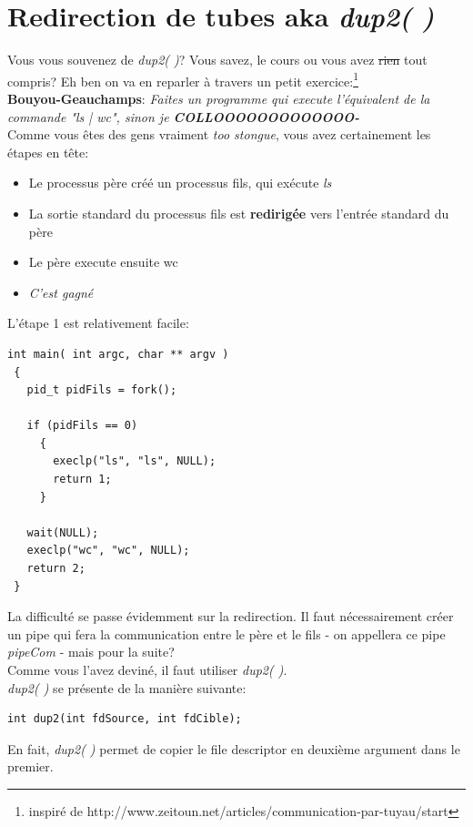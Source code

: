 \documentclass{report}
\begin{document}
\section{Redirection de tubes aka \emph{dup2( )}}
Vous vous souvenez de \emph{dup2( )}? Vous savez, le cours ou vous avez \sout{rien} tout compris? Eh ben on va en reparler à travers un petit exercice:\footnote{inspiré de http://www.zeitoun.net/articles/communication-par-tuyau/start}\\
\textbf{Bouyou-Geauchamps}: \textit{Faites un programme qui execute l'équivalent de la commande "\emph{ls | wc}", sinon je \textbf{COLLOOOOOOOOOOOOO-}}\\

Comme vous êtes des gens vraiment \emph{too stongue}, vous avez certainement les étapes en tête:
\begin{itemize}
\item{Le processus père créé un processus fils, qui exécute \emph{ls}}
\item{La sortie standard du processus fils est \textbf{redirigée} vers l'entrée standard du père}
\item{Le père execute ensuite wc}
\item{\textit{C'est gagné}}
\end{itemize}

L'étape 1 est relativement facile:
\begin{lstlisting}
int main( int argc, char ** argv )
 {
   pid_t pidFils = fork();

   if (pidFils == 0)
     {
       execlp("ls", "ls", NULL);
       return 1;
     }

   wait(NULL);
   execlp("wc", "wc", NULL);
   return 2;
 }
\end{lstlisting}

La difficulté se passe évidemment sur la redirection. Il faut nécessairement créer un pipe qui fera la communication entre le père et le fils - on appellera ce pipe \emph{pipeCom} - mais pour la suite?\\
Comme vous l'avez deviné, il faut utiliser \emph{dup2( )}.\\
\emph{dup2( )} se présente de la manière suivante:
\begin{verbatim}
int dup2(int fdSource, int fdCible);
\end{verbatim}
En fait, \emph{dup2( )} permet de copier le file descriptor en deuxième argument dans le premier.
\end{document}
